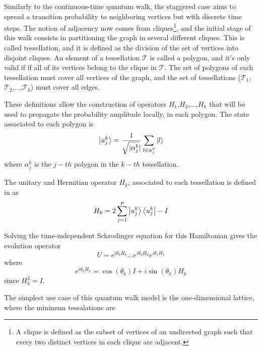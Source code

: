 \documentclass[../../dissertation.tex]{subfiles}
\begin{document}
Similarly to the continuous-time quantum walk, the staggered case aims to spread a transition probability to neighboring vertices but with discrete time steps. The notion of adjacency now comes from cliques\footnote{A clique is defined as the subset of vertices of an undirected graph such that every two distinct vertices in each clique are adjacent.}, and the initial stage of this walk consists in partitioning the graph in several different cliques. This is called tessellation, and it is defined as the division of the set of vertices into disjoint cliques. An element of a tessellation $\mathscr{T}$ is called a polygon, and it's only valid if if all of its vertices belong to the clique in $\mathscr{T}$. The set of polygons of each tessellation must cover all vertices of the graph, and the set of tessellations ($\mathscr{T}_{1}$,$\mathscr{T}_{2}$,...,$\mathscr{T}_{k}$) must cover all edges.\par
These definitions allow the construction of operators $H_1$,$H_2$,...,$H_k$ that will be used to propagate the probability amplitude locally, in each polygon. The state associated to each polygon is
\begin{equation}
	\ket{u_{j}^{k}} = \frac{1}{\sqrt{\mathopen|\alpha_{j}^{k}}\mathclose|}\sum_{l\in\alpha_{j}^{k}}\ket{l}
\end{equation}
where $\alpha_{j}^{k}$ is the $j-th$ polygon in the $k-th$ tessellation.\par
The unitary and Hermitian operator $H_k$, associated to each tessellation is defined in \cite{portugal2017b} as
\begin{equation}
	H_k = 2\sum_{j=1}^{p}\ket{u_{j}^{k}}\bra{u_{j}^{k}} - I
	\label{eq:StagHamil}
\end{equation}\par
Solving the time-independent Schrodinger equation for this Hamiltonian gives the evolution operator
\begin{equation}
	U = e^{i\theta_{k}H_{k}}...e^{i\theta_{2}H_{2}}e^{i\theta_{1}H_{1}}
	\label{eq:stagWalkUnmodOp}
\end{equation}
where
\begin{equation}
	e^{i\theta_{k}H_{k}} = \cos{(\theta_k)}I + i\sin{(\theta_k)}H_k
\end{equation}
since $H_k^2 = I$.\par
The simplest use case of this quantum walk model is the one-dimensional lattice, where the minimum tessalations are
\end{document}
